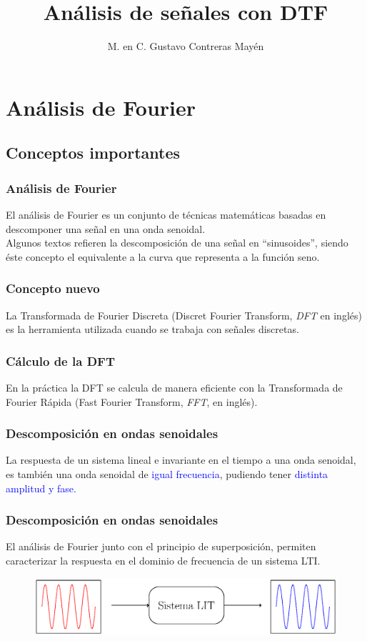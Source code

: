 \documentclass[12pt]{beamer}
\date{}
\title{Análisis de señales con DTF}
\author{M. en C. Gustavo Contreras Mayén}
\begin{document}
\maketitle
\fontsize{14}{14}\selectfont
{}

\section{Análisis de Fourier}
\subsection{Conceptos importantes}

\begin{frame}
\frametitle{Análisis de Fourier}
El análisis de Fourier es un conjunto de técnicas matemáticas basadas en descomponer una señal en una onda senoidal.
\\
\bigskip
\pause
Algunos textos refieren la descomposición de una señal en \enquote{sinusoides}, siendo éste concepto el equivalente a la curva que representa a la función seno.
\end{frame}
\begin{frame}
\frametitle{Concepto nuevo}
La Transformada de Fourier Discreta (Discret Fourier Transform, \emph{DFT} en inglés) es la herramienta utilizada cuando se trabaja con señales discretas.
\end{frame}
\begin{frame}
\frametitle{Cálculo de la DFT}
En la práctica la DFT se calcula de manera eficiente con la Transformada de Fourier Rápida (Fast Fourier Transform, \emph{FFT}, en inglés).
\end{frame}
\begin{frame}
\frametitle{Descomposición en ondas senoidales}
La respuesta de un sistema lineal e invariante en el tiempo a una onda senoidal, es también una onda senoidal de \textcolor{blue}{igual frecuencia}, pudiendo tener \textcolor{blue}{distinta amplitud y fase.}
\end{frame}
\begin{frame}
\frametitle{Descomposición en ondas senoidales}
El análisis de Fourier junto con el principio de superposición, permiten caracterizar la respuesta en el dominio de frecuencia de un sistema LTI.
\begin{figure}
    \centering
    \includegraphics[scale=0.6]{Imagenes/Transformada_Discreta_01.eps}
\end{figure}
\end{frame}
\end{document}
